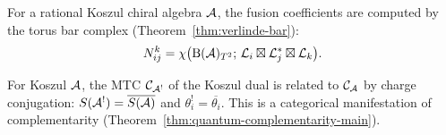 \begin{remark}\label{rem:bar-complex-mtc}
For a rational Koszul chiral algebra $\mathcal{A}$, the fusion coefficients are computed by the torus bar complex (Theorem~\ref{thm:verlinde-bar}):
\begin{equation}\label{eq:bar-verlinde-connection}
N_{ij}^k = \chi\bigl(\mathrm{B}(\mathcal{A})_{T^2};\, \mathcal{L}_i \boxtimes \mathcal{L}_j^* \boxtimes \mathcal{L}_k\bigr).
\end{equation}
\end{remark}

\begin{remark}\label{rem:mtc-koszul}
For Koszul $\mathcal{A}$, the MTC $\mathcal{C}_{\mathcal{A}^!}$ of the Koszul dual is related to $\mathcal{C}_{\mathcal{A}}$ by charge conjugation: $S(\mathcal{A}^!) = \overline{S(\mathcal{A})}$ and $\theta_i^! = \overline{\theta_i}$.  This is a categorical manifestation of complementarity (Theorem~\ref{thm:quantum-complementarity-main}).
\end{remark}
